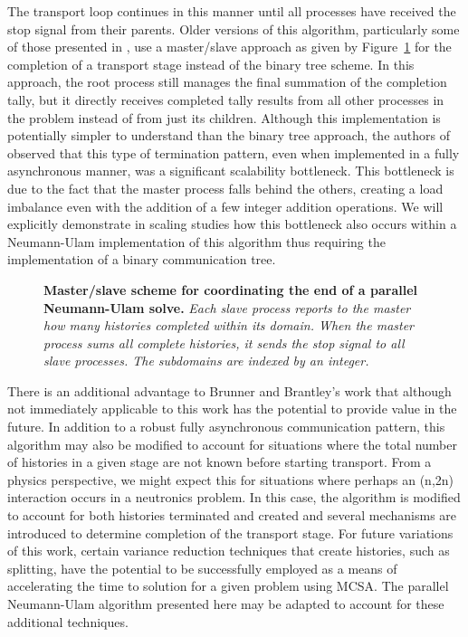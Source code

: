 \documentclass[letterpaper,11pt]{article}
\begin{document}
The transport loop continues in this manner until all processes have
received the stop signal from their parents. Older versions of this
algorithm, particularly some of those presented in
\cite{brunner_comparison_2006}, use a master/slave approach as given
by Figure~\ref{fig:master_comm_tree} for the completion of a transport
stage instead of the binary tree scheme. In this approach, the root
process still manages the final summation of the completion tally, but
it directly receives completed tally results from all other processes
in the problem instead of from just its children. Although this
implementation is potentially simpler to understand than the binary
tree approach, the authors of \cite{brunner_comparison_2006} observed
that this type of termination pattern, even when implemented in a
fully asynchronous manner, was a significant scalability
bottleneck. This bottleneck is due to the fact that the master process
falls behind the others, creating a load imbalance even with the
addition of a few integer addition operations. We will explicitly
demonstrate in scaling studies how this bottleneck also occurs within
a Neumann-Ulam implementation of this algorithm thus requiring the
implementation of a binary communication tree.

\begin{figure}[t!]
  \begin{center}
    \scalebox{0.75}{
       }
  \end{center}
    \caption{\textbf{Master/slave scheme for coordinating the end of a
        parallel Neumann-Ulam solve.} \textit{Each slave process
        reports to the master how many histories completed within its
        domain. When the master process sums all complete histories,
        it sends the stop signal to all slave processes. The
        subdomains are indexed by an integer.}}
  \label{fig:master_comm_tree}
\end{figure}

There is an additional advantage to Brunner and Brantley's work that
although not immediately applicable to this work has the potential to
provide value in the future. In addition to a robust fully
asynchronous communication pattern, this algorithm may also be
modified to account for situations where the total number of histories
in a given stage are not known before starting transport. From a
physics perspective, we might expect this for situations where perhaps
an (n,2n) interaction occurs in a neutronics problem. In this case,
the algorithm is modified to account for both histories terminated and
created and several mechanisms are introduced to determine completion
of the transport stage. For future variations of this work, certain
variance reduction techniques that create histories, such as
splitting, have the potential to be successfully employed as a means
of accelerating the time to solution for a given problem using
MCSA. The parallel Neumann-Ulam algorithm presented here may be
adapted to account for these additional techniques.
\end{document}
